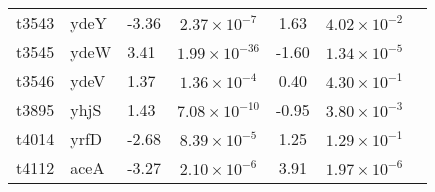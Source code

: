 \begin{table}
\begin{tabular}{ l
    				l
				l
    				c
				c
				c
				c
				}
    t3543 & ydeY & -3.36 & $2.37\times10^{-7}$ & 1.63 & $4.02\times10^{-2}$\\
    t3545 & ydeW & 3.41 & $1.99\times10^{-36}$ & -1.60 & $1.34\times10^{-5}$\\
    t3546 & ydeV & 1.37 & $1.36\times10^{-4}$ & 0.40 & $4.30\times10^{-1}$\\
    t3895 & yhjS & 1.43 & $7.08\times10^{-10}$ & -0.95 & $3.80\times10^{-3}$\\
    t4014 & yrfD & -2.68 & $8.39\times10^{-5}$ & 1.25 & $1.29\times10^{-1}$\\
    t4112 & aceA & -3.27 & $2.10\times10^{-6}$ & 3.91 & $1.97\times10^{-6}$\\
    \bottomrule
    \end{tabular}%
    \label{tab:typhi}%
\end{table}


